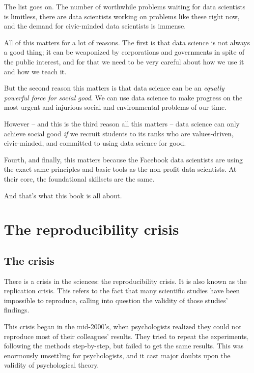 \documentclass[
]{book}
\begin{document}
The list goes on. The number of worthwhile problems waiting for data scientists is limitless, there are data scientists working on problems like these right now, and the demand for civic-minded data scientists is immense.

All of this matters for a lot of reasons. The first is that data science is not always a good thing; it can be weaponized by corporations and governments in spite of the public interest, and for that we need to be very careful about how we use it and how we teach it.

But the second reason this matters is that data science can be an \emph{equally powerful force for social good}. We can use data science to make progress on the most urgent and injurious social and environmental problems of our time.

However -- and this is the third reason all this matters -- data science can only achieve social good \emph{if} we recruit students to its ranks who are values-driven, civic-minded, and committed to using data science for good.

Fourth, and finally, this matters because the Facebook data scientists are using the exact same principles and basic tools as the non-profit data scientists. At their core, the foundational skillsets are the same.

And that's what this book is all about.

\hypertarget{the-reproducibility-crisis}{%
\chapter{The reproducibility crisis}\label{the-reproducibility-crisis}}

\hypertarget{the-crisis}{%
\section*{The crisis}\label{the-crisis}}

There is a crisis in the sciences: the reproducibility crisis. It is also known as the replication crisis. This refers to the fact that many scientific studies have been impossible to reproduce, calling into question the validity of those studies' findings.

This crisis began in the mid-2000's, when psychologists realized they could not reproduce most of their colleagues' results. They tried to repeat the experiments, following the methods step-by-step, but failed to get the same results. This was enormously unsettling for psychologists, and it cast major doubts upon the validity of psychological theory.
\end{document}
